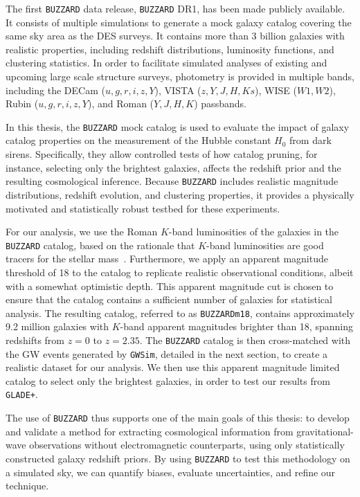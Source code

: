 The first \texttt{BUZZARD} data release, \texttt{BUZZARD} DR1, has been made publicly available. It consists of multiple simulations to generate a mock galaxy catalog covering the same sky area as the \acf{DES} surveys. It contains more than 3 billion galaxies with realistic properties, including redshift distributions, luminosity functions, and clustering statistics. In order to facilitate simulated analyses of existing and upcoming large scale structure surveys, photometry is provided in multiple bands, including the DECam ($u,g,r,i,z,Y$), VISTA ($z,Y,J,H,Ks$), WISE ($W1,W2$), Rubin ($u,g,r,i,z,Y$), and Roman ($Y,J,H,K$) passbands.

In this thesis, the \texttt{BUZZARD} mock catalog is used to evaluate the impact of galaxy catalog properties on the measurement of the Hubble constant $H_0$ from dark sirens. Specifically, they allow controlled tests of how catalog pruning, for instance, selecting only the brightest galaxies, affects the redshift prior and the resulting cosmological inference. Because \texttt{BUZZARD} includes realistic magnitude distributions, redshift evolution, and clustering properties, it provides a physically motivated and statistically robust testbed for these experiments.

For our analysis, we use the Roman $K$-band luminosities of the galaxies in the \texttt{BUZZARD} catalog, based on the rationale that $K$-band luminosities are good tracers for the stellar mass~\citep{strazzullo2006near,sureshkumar2021galaxy}. Furthermore, we apply an apparent magnitude threshold of 18 to the catalog to replicate realistic observational conditions, albeit with a somewhat optimistic depth. This apparent magnitude cut is chosen to ensure that the catalog contains a sufficient number of galaxies for statistical analysis. The resulting catalog, referred to as \texttt{BUZZARDm18}, contains approximately 9.2 million galaxies with $K$-band apparent magnitudes brighter than 18, spanning redshifts from $z=0$ to $z=2.35$. The \texttt{BUZZARD} catalog is then cross-matched with the \ac{GW} events generated by \texttt{GWSim}, detailed in the next section, to create a realistic dataset for our analysis. We then use this apparent magnitude limited catalog to select only the brightest galaxies, in order to test our results from \texttt{GLADE+}.

The use of \texttt{BUZZARD} thus supports one of the main goals of this thesis: to develop and validate a method for extracting cosmological information from gravitational-wave observations without electromagnetic counterparts, using only statistically constructed galaxy redshift priors. By using \texttt{BUZZARD} to test this methodology on a simulated sky, we can quantify biases, evaluate uncertainties, and refine our technique.

